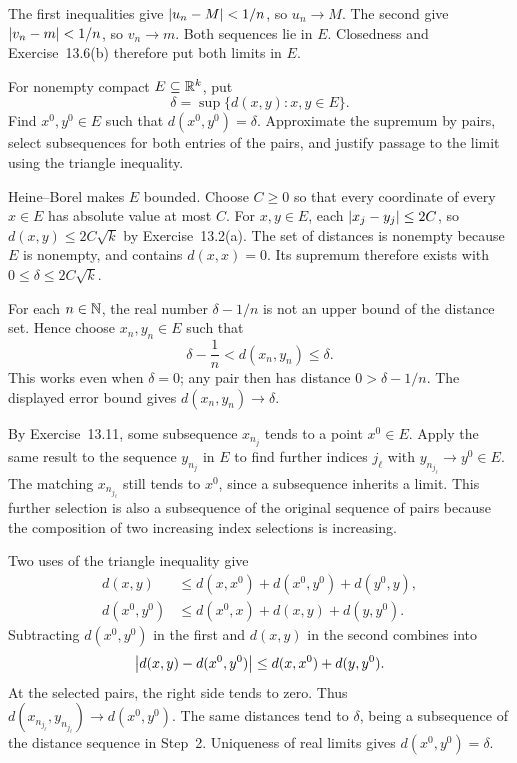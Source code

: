 The first inequalities give $\left|u_n-M\right|<1/n$, so $u_n\to M$.
The second give $\left|v_n-m\right|<1/n$, so $v_n\to m$.
Both sequences lie in $E$. Closedness and Exercise~13.6(b)
therefore put both limits in $E$.

\goal For nonempty compact $E\subseteq\mathbb{R}^k$, put
\[
 \delta=\sup\{d(x,y):x,y\in E\}.
\]
Find $x^0,y^0\in E$ such that $d(x^0,y^0)=\delta$.
\idea Approximate the supremum by pairs, select subsequences
for both entries of the pairs, and justify passage to the limit
using the triangle inequality.

Heine--Borel makes $E$ bounded. Choose $C\ge0$ so that every
coordinate of every $x\in E$ has absolute value at most $C$.
For $x,y\in E$, each $\left|x_j-y_j\right|\le2C$, so
$d(x,y)\le2C\sqrt{k}$ by Exercise~13.2(a).
The set of distances is nonempty because $E$ is nonempty,
and contains $d(x,x)=0$. Its supremum therefore exists with
$0\le\delta\le2C\sqrt{k}$.

For each $n\in\mathbb{N}$, the real number $\delta-1/n$ is not
an upper bound of the distance set. Hence choose $x_n,y_n\in E$
such that
\[
 \delta-\frac1n<d(x_n,y_n)\le\delta.
\]
This works even when $\delta=0$; any pair then has distance
$0>\delta-1/n$. The displayed error bound gives
$d(x_n,y_n)\to\delta$.

By Exercise~13.11, some subsequence $x_{n_j}$ tends to a
point $x^0\in E$. Apply the same result to the sequence
$y_{n_j}$ in $E$ to find further indices $j_\ell$ with
$y_{n_{j_\ell}}\to y^0\in E$.
The matching $x_{n_{j_\ell}}$ still tends to $x^0$, since
a subsequence inherits a limit. This further selection is
also a subsequence of the original sequence of pairs because
the composition of two increasing index selections is increasing.

Two uses of the triangle inequality give
\[
 \begin{split}
 d(x,y)&\le d(x,x^0)+d(x^0,y^0)+d(y^0,y),\\
 d(x^0,y^0)&\le d(x^0,x)+d(x,y)+d(y,y^0).
 \end{split}
\]
Subtracting $d(x^0,y^0)$ in the first and $d(x,y)$ in the
second combines into
\[
 \left|d(x,y)-d(x^0,y^0)\right|\le d(x,x^0)+d(y,y^0).
\]
At the selected pairs, the right side tends to zero. Thus
$d(x_{n_{j_\ell}},y_{n_{j_\ell}})\to d(x^0,y^0)$.
The same distances tend to $\delta$, being a subsequence of
the distance sequence in Step~2. Uniqueness of real limits
gives $d(x^0,y^0)=\delta$.

